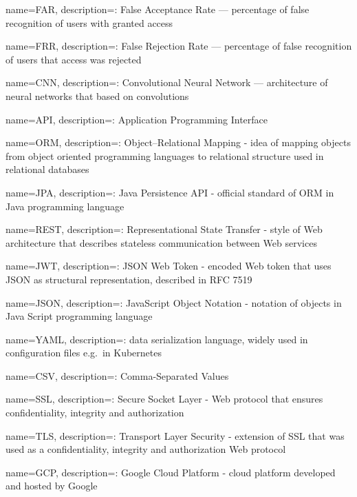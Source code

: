 \makeglossaries

{
name=FAR,
description={: False Acceptance Rate --- percentage of false recognition of users with granted access}
}

{
name=FRR,
description={: False Rejection Rate --- percentage of false recognition of users that access was rejected}
}

{
name=CNN,
description={: Convolutional Neural Network --- architecture of neural networks that based on convolutions}
}

{
name=API,
description={: Application Programming Interface}
}

{
name=ORM,
description={: Object–Relational Mapping - idea of mapping objects from object oriented programming languages to relational structure used in relational databases}
}

{
name=JPA,
description={: Java Persistence API - official standard of ORM in Java programming language}
}

{
name=REST,
description={: Representational State Transfer - style of Web architecture that describes stateless communication between Web services}
}

{
name=JWT,
description={: JSON Web Token - encoded Web token that uses JSON as structural representation, described in RFC 7519}
}

{
name=JSON,
description={: JavaScript Object Notation - notation of objects in Java Script programming language}
}

{
name=YAML,
description={: data serialization language, widely used in configuration files e.g.\ in Kubernetes}
}

{
name=CSV,
description={: Comma-Separated Values}
}

{
name=SSL,
description={: Secure Socket Layer - Web protocol that ensures confidentiality, integrity and authorization}
}

{
name=TLS,
description={: Transport Layer Security - extension of SSL that was used as a confidentiality, integrity and authorization Web protocol}
}

{
name=GCP,
description={: Google Cloud Platform - cloud platform developed and hosted by Google}
}

